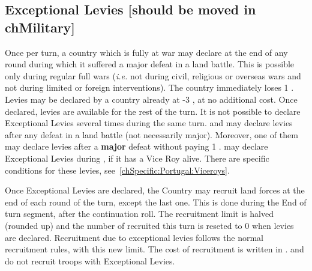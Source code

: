 \subsection{Exceptional Levies [should be moved in chMilitary]}
\label{chLogistic:Exceptional Levies}
\label{chMilitary:Exceptional Levies}


\bparag Once per turn, a country which is fully at war may declare
 at the end of any round during which it suffered a
major defeat in a land battle. This is possible only during regular full wars
(\emph{i.e.} not during civil, religious or overseas wars and not during
limited or foreign interventions).
\bparag The country immediately loses 1 \STAB. Levies may be declared by a
country already at -3 \STAB, at no additional cost.
\bparag Once declared, levies are available for the rest of the turn. It is
not possible to declare Exceptional Levies several times during the same
turn.
\bparag[Exception:] \SUE and \PRU may declare levies after any defeat in a land
battle (not necessarily major). Moreover, one of them may declare levies after
a \textbf{major} defeat without paying 1 \STAB.
\bparag[Exception:] \POR may declare Exceptional Levies during , if it has a Vice Roy alive. There are specific conditions for these
levies, see~\ref{chSpecific:Portugal:Viceroys}.

\bparag Once Exceptional Levies are declared, the Country may recruit land
forces at the end of each round of the turn, except the last one. This is done
during the End of turn segment, after the continuation roll.
\bparag The recruitment limit is halved (rounded up) and the number of \LD
recruited this turn is reseted to 0 when levies are declared.
\bparag Recruitment due to exceptional levies follows the normal recruitment
rules, with this new limit.
\bparag The cost of recruitment is written in .
\bparag \SUE and \PRU do not recruit  troops with Exceptional
Levies.

